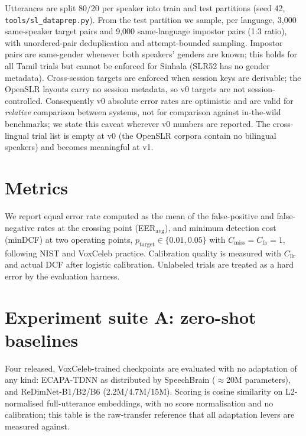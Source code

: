 Utterances are split 80/20 per speaker into train and test partitions
(seed 42, \texttt{tools/sl\_dataprep.py}). From the test partition we
sample, per language, 3{,}000 same-speaker target pairs and 9{,}000
same-language impostor pairs (1:3 ratio), with unordered-pair
deduplication and attempt-bounded sampling. Impostor pairs are
same-gender whenever both speakers' genders are known; this holds for
all Tamil trials but cannot be enforced for Sinhala (SLR52 has no
gender metadata). Cross-session targets are enforced when session
keys are derivable; the OpenSLR layouts carry no session metadata, so
v0 targets are not session-controlled. Consequently v0 absolute error
rates are optimistic and are valid for \emph{relative} comparison
between systems, not for comparison against in-the-wild benchmarks;
we state this caveat wherever v0 numbers are reported. The
cross-lingual trial list is empty at v0 (the OpenSLR corpora contain
no bilingual speakers) and becomes meaningful at v1.

\section{Metrics}
\label{ssec:metrics}

We report equal error rate computed as the mean of the false-positive
and false-negative rates at the crossing point (EER$_{\mathrm{avg}}$),
and minimum detection cost (minDCF) at two operating points,
$p_{\mathrm{target}} \in \{0.01, 0.05\}$ with
$C_{\mathrm{miss}}=C_{\mathrm{fa}}=1$, following NIST and VoxCeleb
practice. Calibration quality is measured with $C_{\mathrm{llr}}$ and
actual DCF after logistic calibration. Unlabeled trials are treated
as a hard error by the evaluation harness.

\section{Experiment suite A: zero-shot baselines}
\label{ssec:zeroshot}

Four released, VoxCeleb-trained checkpoints are evaluated with no
adaptation of any kind: ECAPA-TDNN \cite{desplanques2020ecapa} as
distributed by SpeechBrain \cite{ravanelli2021speechbrain}
($\approx$20M parameters), and ReDimNet-B1/B2/B6
\cite{yakovlev2024redimnet} (2.2M/4.7M/15M). Scoring is cosine
similarity on L2-normalised full-utterance embeddings, with no score
normalisation and no calibration; this table is the raw-transfer
reference that all adaptation levers are measured against.

